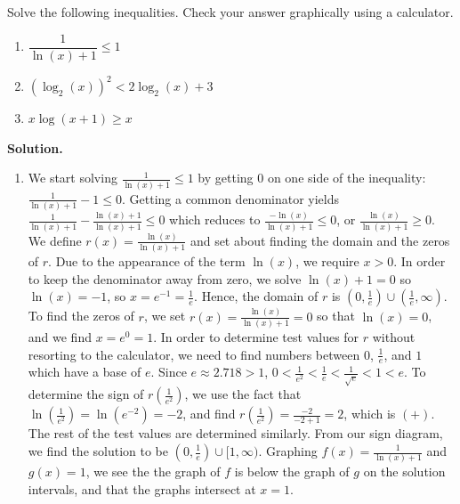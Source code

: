 \begin{ex}  Solve the following inequalities.  Check your answer graphically using a calculator.
\label{logineq}

\begin{multicols}{3}

\begin{enumerate}

\item  $\dfrac{1}{\ln(x)+1} \leq 1$

\item  $\left(\log_{2}(x)\right)^2 < 2 \log_{2}(x) + 3$

\item  $x \log(x+1) \geq x$


\end{enumerate}

\end{multicols}


{\bf Solution.}  

\begin{enumerate}

\item  We start solving $\frac{1}{\ln(x)+1} \leq 1$ by getting $0$ on one side of the inequality: $\frac{1}{\ln(x)+1}  - 1 \leq 0$.  Getting a common denominator yields $\frac{1}{\ln(x)+1}  - \frac{\ln(x)+1}{\ln(x)+1} \leq 0$ which reduces to $\frac{-\ln(x)}{\ln(x)+1} \leq 0$, or $ \frac{\ln(x)}{\ln(x)+1} \geq 0$.  We define $r(x) = \frac{\ln(x)}{\ln(x)+1}$ and set about finding the domain and the zeros of $r$.  Due to the appearance of the term $\ln(x)$, we require  $x > 0$.  In order to keep the denominator away from zero, we solve $\ln(x)+1 = 0$ so $\ln(x) = -1$, so $x = e^{-1} = \frac{1}{e}$.  Hence, the domain of $r$ is $\left(0, \frac{1}{e}\right) \cup \left(\frac{1}{e}, \infty\right)$.  To find the zeros of $r$, we set $r(x) = \frac{\ln(x)}{\ln(x)+1} = 0$ so that $\ln(x) = 0$, and we find $x = e^{0} = 1$.  In order to determine test values for $r$ without resorting to the calculator, we need to find numbers between $0$, $\frac{1}{e}$, and $1$ which have a base of $e$.  Since $e \approx 2.718 > 1$, $0 < \frac{1}{e^2} < \frac{1}{e} < \frac{1}{\sqrt{e}} < 1 < e$.  To determine the sign of $r\left( \frac{1}{e^2} \right)$, we use the fact that $\ln\left(\frac{1}{e^2}\right) = \ln\left(e^{-2}\right) = -2$, and find $r\left( \frac{1}{e^2} \right) = \frac{-2}{-2+1} = 2$, which is $(+)$.  The rest of the test values are determined similarly.   From our sign diagram, we find the solution to be $\left(0, \frac{1}{e}\right) \cup [1, \infty)$. Graphing $f(x) =  \frac{1}{\ln(x)+1}$ and $g(x) = 1$, we see the the graph of $f$ is below the graph of $g$ on the solution intervals, and that the graphs intersect at $x=1$.


\end{enumerate}
\end{ex}
